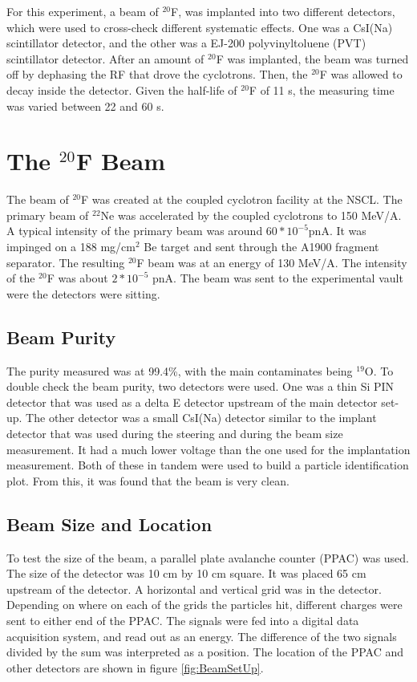 \documentclass[../MaxHughesThesis.tex]{subfiles}
\begin{document}
For this experiment, a  beam of  $^{20}$F, was implanted into two different detectors, which were used to cross-check different systematic effects.
One was a CsI(Na) scintillator detector, and the other was a  EJ-200 polyvinyltoluene (PVT) scintillator detector. 
After an amount of $^{20}$F was implanted, the beam was turned off by dephasing the RF that drove the cyclotrons.
Then, the $^{20}$F was allowed to decay inside the detector. 
Given the half-life of $^{20}$F of 11 s, the measuring time was varied between 22 and 60 s.

\section{The $^{20}$F Beam}

The beam of $^{20}$F was created at the coupled cyclotron facility at the NSCL.
The primary beam of $^{22}$Ne was accelerated by the coupled cyclotrons to 150 MeV/A. 
A typical intensity of the primary beam was around $60 * 10^{-5}$pnA.
It was impinged on a 188 mg/cm$^{2}$ Be target and sent through the A1900 fragment separator. 
The resulting $^{20}$F beam was at an energy of 130 MeV/A. 
The intensity of the $^{20}$F was about $2 * 10^{-5}$ pnA.
The beam was sent to the experimental vault were the detectors were sitting.

\subsection{Beam Purity}

The purity measured was at 99.4\%, with the main contaminates being  $^{19}$O. 
To double check the beam purity, two detectors were used. 
One was a thin Si PIN detector that was used as a delta E detector upstream of the main detector set-up. 
The other detector was a small CsI(Na) detector similar to the implant detector that was used during the steering and during the beam size measurement. 
It had a much lower voltage than the one used for the implantation measurement. 
Both of these in tandem were used to build a particle identification plot.
From this, it was found that the beam is very clean.

\subsection{Beam Size and Location}
To test the size of the beam, a parallel plate avalanche counter (PPAC) was used.
The size of the detector was 10 cm by 10 cm square. 
It was placed 65 cm upstream of the detector.
A horizontal and vertical grid was in the detector.
Depending on where on each of the grids the particles hit, different charges were sent to either end of the PPAC.
The signals were fed into a digital data acquisition system, and read out as an energy.
The difference of the two signals divided by the sum was interpreted as a position.
The location of the PPAC and other detectors are shown in figure \ref{fig:BeamSetUp}.
\end{document}
